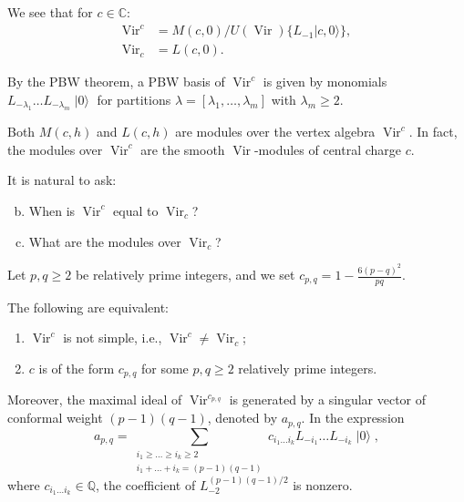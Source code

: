\documentclass{beamer}
\DeclareMathOperator{\Vir}{Vir}
\DeclareMathOperator{\vac}{|0\rangle}
\begin{document}
\begin{frame}

  We see that for $c \in \mathbb{C}$:
  \begin{align*}
    \Vir^c &= M(c, 0)/U(\Vir)\{L_{-1}|c, 0\rangle\}, \\
    \Vir_c &= L(c, 0).
  \end{align*}

  By the PBW theorem, a PBW basis of $\Vir^c$ is given by monomials $L_{-\lambda_1}\dots L_{-\lambda_m}\vac$ for partitions $\lambda = [\lambda_1, \dots, \lambda_m]$ with $\lambda_m \ge 2$.

  \begin{example}[Modules over $\Vir^c$]
    \label{exa:2}
    Both $M(c, h)$ and $L(c, h)$ are modules over the vertex algebra $\Vir^c$.
    In fact, the modules over $\Vir^c$ are the smooth $\Vir$-modules of central charge $c$.
  \end{example}

  It is natural to ask:
  \begin{enumerate}[(a)]
    \setcounter{enumi}{1}
  \item When is $\Vir^c$ equal to $\Vir_c$?
  \item What are the modules over $\Vir_c$?
  \end{enumerate}

\end{frame}

\begin{frame}

  Let $p, q \ge 2$ be relatively prime integers, and we set $c_{p, q} = 1 - \frac{6(p - q)^2}{pq}$.

  \begin{theorem}
    \label{thr:3}
    The following are equivalent:
    \begin{enumerate}
    \item $\Vir^c$ is not simple, i.e., $\Vir^c \neq \Vir_c$;
    \item $c$ is of the form $c_{p, q}$ for some $p, q \ge 2$ relatively prime integers.
    \end{enumerate}
    Moreover, the maximal ideal of $\Vir^{c_{p, q}}$ is generated by a singular vector of conformal weight $(p - 1)(q - 1)$, denoted by $a_{p, q}$.
    In the expression
    \begin{equation*}
      a_{p, q} = \sum_{\substack{i_1 \ge \dots \ge i_k \ge 2 \\ i_1 + \dots + i_k = (p - 1)(q - 1)}}c_{i_1\dots i_k}L_{-i_1}\dots L_{-i_k}\vac,
    \end{equation*}
    where $c_{i_1\dots i_k} \in \mathbb{Q}$, the coefficient of $L_{-2}^{(p - 1)(q - 1)/2}$ is nonzero.
  \end{theorem}

\end{frame}
\end{document}
